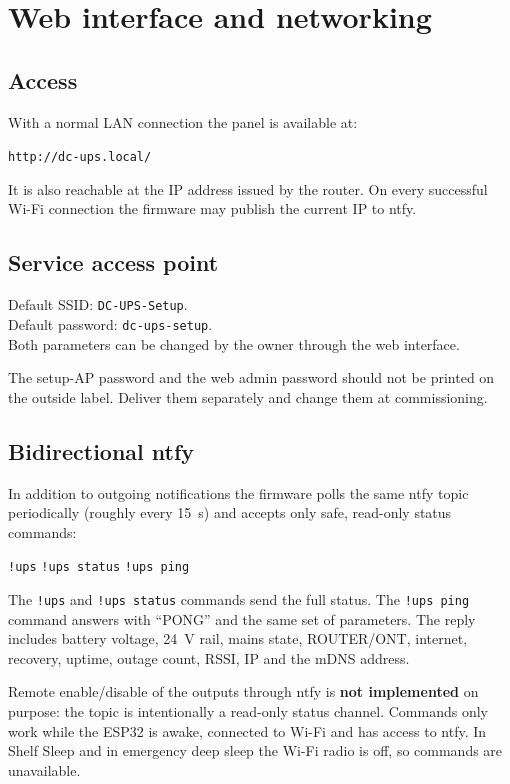\documentclass[11pt,a4paper]{article}
\begin{document}
\section{Web interface and networking}

\subsection{Access}
With a normal LAN connection the panel is available at:
\begin{center}
\texttt{http://dc-ups.local/}
\end{center}
It is also reachable at the IP address issued by the router. On every successful Wi-Fi connection the firmware may publish the current IP to ntfy.

\subsection{Service access point}
Default SSID: \texttt{DC-UPS-Setup}.\\
Default password: \texttt{dc-ups-setup}.\\
Both parameters can be changed by the owner through the web interface.

\begin{tcolorbox}[colback=lightaccent,colframe=accent,title=Recommendation]
The setup-AP password and the web admin password should not be printed on the outside label. Deliver them separately and change them at commissioning.
\end{tcolorbox}

\subsection{Bidirectional ntfy}
In addition to outgoing notifications the firmware polls the same ntfy topic periodically (roughly every 15~s) and accepts only safe, read-only status commands:
\begin{center}
\texttt{!ups} \qquad \texttt{!ups status} \qquad \texttt{!ups ping}
\end{center}
The \texttt{!ups} and \texttt{!ups status} commands send the full status. The \texttt{!ups ping} command answers with ``PONG'' and the same set of parameters. The reply includes battery voltage, 24~V rail, mains state, ROUTER/ONT, internet, recovery, uptime, outage count, RSSI, IP and the mDNS address.

Remote enable/disable of the outputs through ntfy is \textbf{not implemented} on purpose: the topic is intentionally a read-only status channel. Commands only work while the ESP32 is awake, connected to Wi-Fi and has access to ntfy. In Shelf Sleep and in emergency deep sleep the Wi-Fi radio is off, so commands are unavailable.
\end{document}

